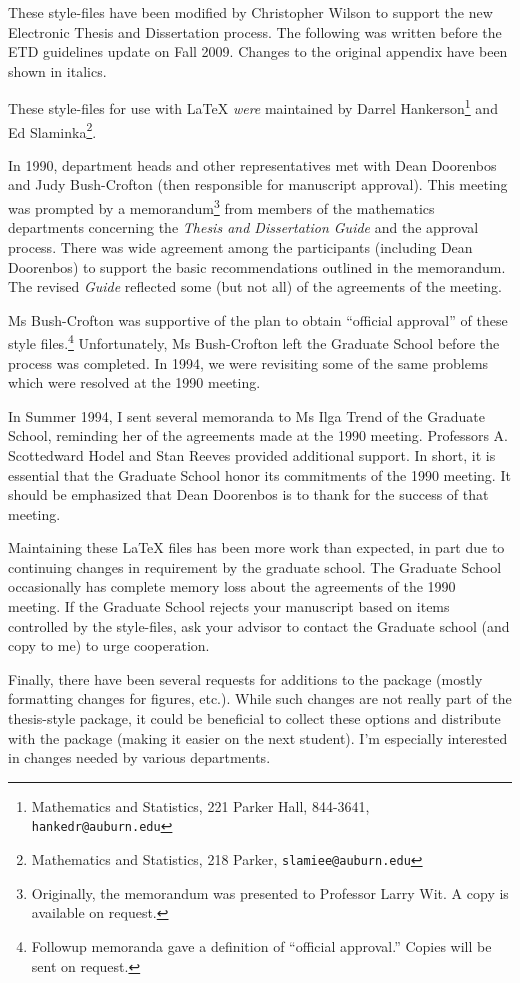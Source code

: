 \documentclass[12pt]{report}
\begin{document}
\begin{singlespace}
These style-files have been modified by Christopher Wilson to support the new Electronic Thesis and Dissertation process. The following was written before the ETD guidelines update on Fall 2009. Changes to the original appendix have been shown in italics. 

These style-files for use with \LaTeX{} {\it were} maintained by Darrel
Hankerson\footnote{Mathematics and Statistics, 221 Parker Hall,
844-3641, {\tt hankedr@auburn.edu}} and Ed
Slaminka\footnote{Mathematics and Statistics, 218 Parker,
{\tt slamiee@auburn.edu}}.

In 1990, department heads and other representatives met with Dean Doorenbos
and Judy Bush-Crofton (then responsible for manuscript approval). This
meeting was prompted by a memorandum\footnote{Originally, the memorandum
was presented to Professor Larry Wit. A copy is available on request.} from
members of the mathematics departments concerning the {\em Thesis and
Dissertation Guide\/} and the approval process. There was wide agreement
among the participants (including Dean Doorenbos) to support the basic
recommendations outlined in the memorandum. The revised {\em Guide\/}
reflected some (but not all) of the agreements of the meeting.

Ms Bush-Crofton was supportive of the plan to obtain ``official approval''
of these style files.\footnote{Followup memoranda gave a definition of
``official approval.'' Copies will be sent on request.}  Unfortunately, Ms
Bush-Crofton left the Graduate School before the process was completed. In
1994, we were revisiting some of the same problems which were
resolved at the 1990 meeting.

In Summer 1994, I sent several memoranda to Ms Ilga Trend of the Graduate
School, reminding her of the agreements made at the 1990 meeting.
Professors A. Scottedward Hodel and Stan Reeves provided additional
support.  In short, it is essential that the Graduate School honor its
commitments of the 1990 meeting. It should be emphasized that Dean
Doorenbos is to thank for the success of that meeting.

Maintaining these \LaTeX{} files has been more work than expected, in
part due to continuing changes in requirement by the graduate school.
The Graduate School occasionally has complete memory loss about the
agreements of the 1990 meeting. If the Graduate School rejects your
manuscript based on items controlled by the style-files, ask
your advisor to contact the Graduate school (and copy to me) to urge
cooperation.

Finally, there have been several requests for additions to the package
(mostly formatting changes for figures, etc.). While such changes are not
really part of the thesis-style package, it could be beneficial to collect
these options and distribute with the package (making it easier on the next
student).  I'm especially interested in changes needed by various
departments.

\end{singlespace}
\end{document}
